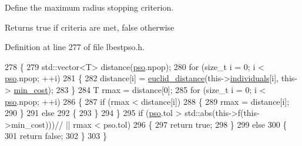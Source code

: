 Define the maximum radius stopping criterion. 

\begin{DoxyReturn}{Returns}
true if criteria are met, false otherwise 
\end{DoxyReturn}


Definition at line 277 of file lbestpso.\+h.


\begin{DoxyCode}
278     \{
279         std::vector<T> distance(\hyperlink{classea_1_1_solver_3_01_p_s_ol_00_01_t_00_01_f_00_01_c_01_4_a3098f083ef04a0ce7ae0eef22dd80442}{pso}.npop);
280         \textcolor{keywordflow}{for} (\textcolor{keywordtype}{size\_t} i = 0; i < \hyperlink{classea_1_1_solver_3_01_p_s_ol_00_01_t_00_01_f_00_01_c_01_4_a3098f083ef04a0ce7ae0eef22dd80442}{pso}.npop; ++i)
281         \{
282             distance[i] = \hyperlink{classea_1_1_solver_3_01_p_s_ol_00_01_t_00_01_f_00_01_c_01_4_a21df6a4efb4d058ecd3bc342e318b59a}{euclid\_distance}(this->\hyperlink{classea_1_1_solver__base_ad75bc440d24a46e97694c7c889f2ecde}{individuals}[i], this->
      \hyperlink{classea_1_1_solver__base_af745cded954be26280d842c1e7c7f989}{min\_cost});
283         \}
284         T rmax = distance[0];
285         \textcolor{keywordflow}{for} (\textcolor{keywordtype}{size\_t} i = 0; i < \hyperlink{classea_1_1_solver_3_01_p_s_ol_00_01_t_00_01_f_00_01_c_01_4_a3098f083ef04a0ce7ae0eef22dd80442}{pso}.npop; ++i)
286         \{
287             \textcolor{keywordflow}{if} (rmax < distance[i])
288             \{
289                 rmax = distance[i];
290             \}
291             \textcolor{keywordflow}{else}
292             \{
293             \}
294         \}
295         \textcolor{keywordflow}{if} (\hyperlink{classea_1_1_solver_3_01_p_s_ol_00_01_t_00_01_f_00_01_c_01_4_a3098f083ef04a0ce7ae0eef22dd80442}{pso}.tol > std::abs(this->f(this->min\_cost)))\textcolor{comment}{// || rmax < pso.tol)}
296         \{
297             \textcolor{keywordflow}{return} \textcolor{keyword}{true};
298         \}
299         \textcolor{keywordflow}{else}
300         \{
301             \textcolor{keywordflow}{return} \textcolor{keyword}{false};
302         \}
303     \}
\end{DoxyCode}
\mbox{\label{classea_1_1_solver_3_01_p_s_ol_00_01_t_00_01_f_00_01_c_01_4_aaccd379111d0ebcf820fdce19ab23023}} 
